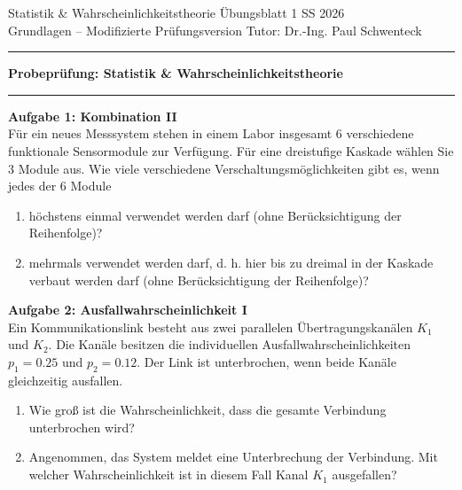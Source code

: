 \documentclass[11pt,a4paper]{article}
\begin{document}

\textsf{Statistik \& Wahrscheinlichkeitstheorie Übungsblatt 1} \hfill \textsf{SS 2026} \\
\textsf{Grundlagen -- Modifizierte Prüfungsversion} \hfill \textsf{Tutor: Dr.-Ing. Paul Schwenteck} \\

\hrule
\vspace{0.4cm}
\begin{center}
    \LARGE \textbf{Probeprüfung: Statistik \& Wahrscheinlichkeitstheorie}
\end{center}
\vspace{0.1cm}
\hrule
\vspace{0.6cm}

\textbf{Aufgabe 1: Kombination II} \\
Für ein neues Messsystem stehen in einem Labor insgesamt 6 verschiedene funktionale Sensormodule zur Verfügung. Für eine dreistufige Kaskade wählen Sie 3 Module aus. Wie viele verschiedene Verschaltungsmöglichkeiten gibt es, wenn jedes der 6 Module
\begin{enumerate}
    \item[a)] höchstens einmal verwendet werden darf (ohne Berücksichtigung der Reihenfolge)?
    \item[b)] mehrmals verwendet werden darf, d. h. hier bis zu dreimal in der Kaskade verbaut werden darf (ohne Berücksichtigung der Reihenfolge)?
\end{enumerate}

\vspace{0.5cm}

\textbf{Aufgabe 2: Ausfallwahrscheinlichkeit I} \\
Ein Kommunikationslink besteht aus zwei parallelen Übertragungskanälen $K_1$ und $K_2$. Die Kanäle besitzen die individuellen Ausfallwahrscheinlichkeiten $p_1 = 0.25$ und $p_2 = 0.12$. Der Link ist unterbrochen, wenn beide Kanäle gleichzeitig ausfallen.
\begin{enumerate}
    \item[a)] Wie groß ist die Wahrscheinlichkeit, dass die gesamte Verbindung unterbrochen wird?
    \item[b)] Angenommen, das System meldet eine Unterbrechung der Verbindung. Mit welcher Wahrscheinlichkeit ist in diesem Fall Kanal $K_1$ ausgefallen?
\end{enumerate}
\end{document}

